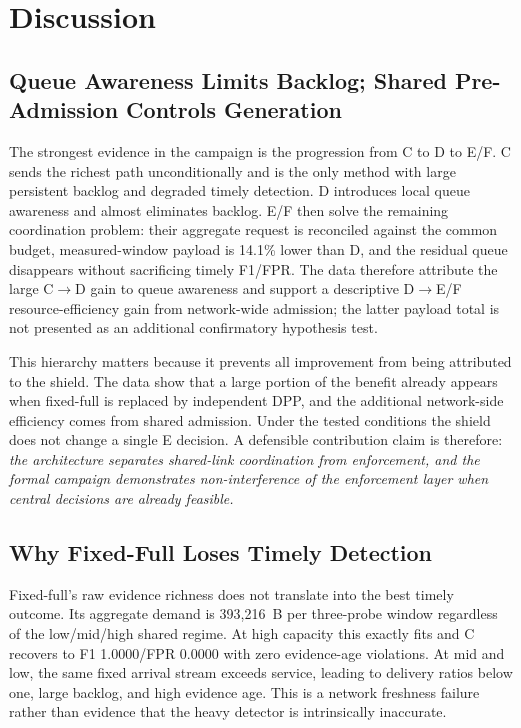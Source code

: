 \documentclass[10pt,journal]{IEEEtran}
\begin{document}
\section{Discussion}
\subsection{Queue Awareness Limits Backlog; Shared Pre-Admission Controls Generation}
The strongest evidence in the campaign is the progression from C to D to E/F. C sends the richest path unconditionally and is the only method with large persistent backlog and degraded timely detection. D introduces local queue awareness and almost eliminates backlog. E/F then solve the remaining coordination problem: their aggregate request is reconciled against the common budget, measured-window payload is 14.1\% lower than D, and the residual queue disappears without sacrificing timely F1/FPR. The data therefore attribute the large C$\rightarrow$D gain to queue awareness and support a descriptive D$\rightarrow$E/F resource-efficiency gain from network-wide admission; the latter payload total is not presented as an additional confirmatory hypothesis test.

This hierarchy matters because it prevents all improvement from being attributed to the shield. The data show that a large portion of the benefit already appears when fixed-full is replaced by independent DPP, and the additional network-side efficiency comes from shared admission. Under the tested conditions the shield does not change a single E decision. A defensible contribution claim is therefore: \emph{the architecture separates shared-link coordination from enforcement, and the formal campaign demonstrates non-interference of the enforcement layer when central decisions are already feasible.}

\subsection{Why Fixed-Full Loses Timely Detection}
Fixed-full's raw evidence richness does not translate into the best timely outcome. Its aggregate demand is 393,216~B per three-probe window regardless of the low/mid/high shared regime. At high capacity this exactly fits and C recovers to F1 1.0000/FPR 0.0000 with zero evidence-age violations. At mid and low, the same fixed arrival stream exceeds service, leading to delivery ratios below one, large backlog, and high evidence age. This is a network freshness failure rather than evidence that the heavy detector is intrinsically inaccurate.
\end{document}
